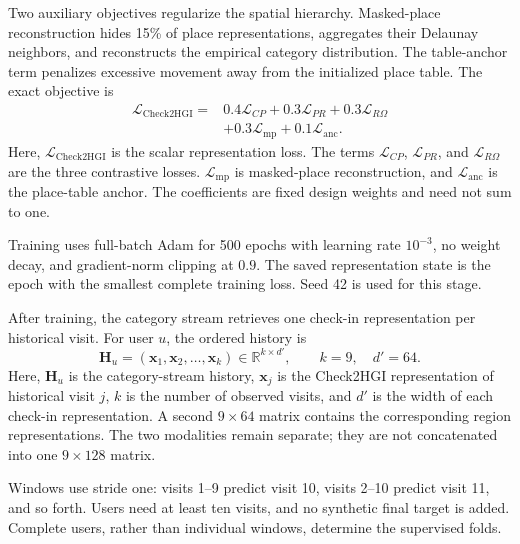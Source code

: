 Two auxiliary objectives regularize the spatial hierarchy. Masked-place
reconstruction hides 15\% of place representations, aggregates their Delaunay
neighbors, and reconstructs the empirical category distribution. The table-anchor
term penalizes excessive movement away from the initialized place table. The exact
objective is
\begin{equation}
\begin{split}
    \mathcal{L}_{\mathrm{Check2HGI}}={}&
    0.4\mathcal{L}_{C\!P}+0.3\mathcal{L}_{P\!R}
    +0.3\mathcal{L}_{R\!\Omega}\\
    &+0.3\mathcal{L}_{\mathrm{mp}}+0.1\mathcal{L}_{\mathrm{anc}}.
\end{split}
\label{eq:apx-check2hgi-loss}
\end{equation}
Here, $\mathcal{L}_{\mathrm{Check2HGI}}$ is the scalar representation loss.
The terms $\mathcal{L}_{C\!P}$, $\mathcal{L}_{P\!R}$, and
$\mathcal{L}_{R\!\Omega}$ are the three contrastive losses.
$\mathcal{L}_{\mathrm{mp}}$ is masked-place reconstruction, and
$\mathcal{L}_{\mathrm{anc}}$ is the place-table anchor. The coefficients are fixed
design weights and need not sum to one.

Training uses full-batch Adam for 500 epochs with learning rate $10^{-3}$, no weight
decay, and gradient-norm clipping at $0.9$. The saved representation state is the
epoch with the smallest complete training loss. Seed 42 is used for this stage.

After training, the category stream retrieves one check-in representation per
historical visit. For user $u$, the ordered history is
\begin{equation}
    \mathbf{H}_u=(\mathbf{x}_1,\mathbf{x}_2,\ldots,\mathbf{x}_k)
    \in\mathbb{R}^{k\times d'},\qquad k=9,\quad d'=64.
    \label{eq:apx-user-sequence}
\end{equation}
Here, $\mathbf{H}_u$ is the category-stream history, $\mathbf{x}_j$ is the
Check2HGI representation of historical visit $j$, $k$ is the number of observed
visits, and $d'$ is the width of each check-in representation. A second
$9\times64$ matrix contains the corresponding region representations. The two
modalities remain separate; they are not concatenated into one $9\times128$
matrix.

Windows use stride one: visits 1--9 predict visit 10, visits 2--10 predict visit
11, and so forth. Users need at least ten visits, and no synthetic final target is
added. Complete users, rather than individual windows, determine the supervised
folds.

